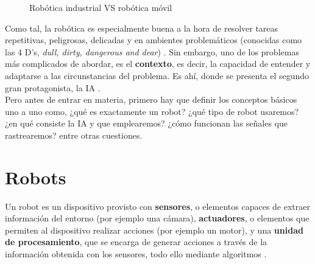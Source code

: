 \begin{figure} [h]
	\centering
	\quad
	\caption{Robótica industrial VS robótica móvil}
	\label{fig:industrial_vs_mobile}
\end{figure}

Como tal, la robótica es especialmente buena a la hora de resolver tareas repetitivas, peligrosas, delicadas y en ambientes problemáticos (conocidas como las 4 D's, \emph{dull, dirty, dangerous and dear}) \cite{4-d}. Sin embargo, uno de los problemas más complicados de abordar, es el \textbf{contexto}, es decir, la capacidad de entender y adaptarse a las circunstancias del problema. Es ahí, donde se presenta el segundo gran protagonista, la \ac{IA} \cite{dworakowski2020robots}.\\

Pero antes de entrar en materia, primero hay que definir los conceptos básicos uno a uno como, ¿qué es exactamente un robot? ¿qué tipo de robot usaremos? ¿en qué consiste la \ac{IA} y que emplearemos? ¿cómo funcionan las señales que rastrearemos? entre otras cuestiones.

\section{Robots}
\label{sec:robots}

Un robot es un dispositivo provisto con \textbf{sensores}, o elementos capaces de extraer información del entorno (por ejemplo una cámara), \textbf{actuadores}, o elementos que permiten al dispositivo realizar acciones (por ejemplo un motor), y una \textbf{unidad de procesamiento}, que se encarga de generar acciones a través de la información obtenida con los sensores, todo ello mediante algoritmos \cite{Wang2022}.\\

